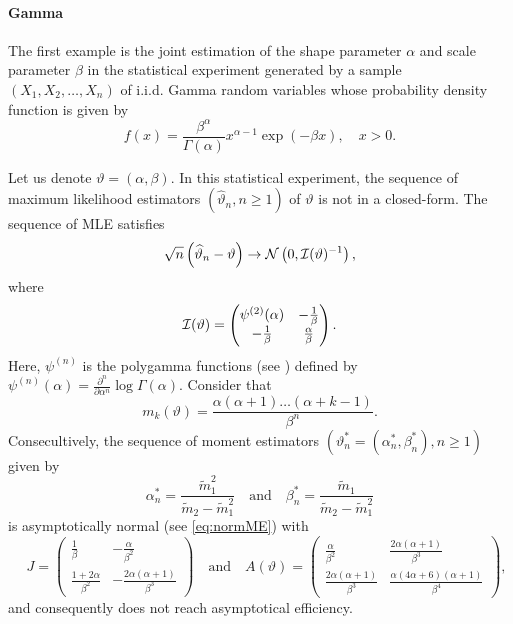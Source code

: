 \paragraph{Gamma}

The first example is the joint estimation of the shape parameter $\alpha$  and scale parameter $\beta$ in the statistical experiment generated by a sample $(X_1,X_2,\ldots,X_n)$ of i.i.d. Gamma random variables whose probability density function is given by
$$ f(x)= \frac{\beta^\alpha}{\Gamma(\alpha)}x^{\alpha-1} \exp( - \beta x ), \quad x >0.$$

Let us denote $\vartheta=(\alpha,\beta)$. In this statistical experiment, the sequence of maximum likelihood estimators $(\widehat{\vartheta}_n, n \geq 1)$ of $\vartheta$ is not in a closed-form.  The sequence of MLE satisfies 
$$ \sqrt{n}\left( \widehat{\vartheta}_n-\vartheta \right) \rightarrow {\cal N}\left(0,{\cal I}(\vartheta)^{-1}\right),$$
where 
$$ {\cal I}(\vartheta)=\begin{pmatrix} \psi^{(2)}(\alpha) & -\frac{1}{\beta} \\ - \frac{1}{\beta} &  \frac{\alpha}{\beta}\end{pmatrix}.$$
Here, $\psi^{(n)}$ is the polygamma functions (see  \cite[section 6.4.1, page 260]{AS72}) defined by $\psi^{(n)}(\alpha)=\frac{\partial^n}{\partial \alpha^n} \log \Gamma(\alpha)$. Consider that 
$$ m_k(\vartheta) = \frac{\alpha(\alpha+1) \ldots (\alpha+k-1)}{\beta^n}.$$
Consecultively, the sequence of moment estimators  $(\vartheta^*_n=(\alpha^*_n,\beta^*_n), n \geq1)$  given by
$$\alpha^*_n=\frac{\tilde{m}_1^2}{\tilde{m}_2-\tilde{m}_1^2} \quad \mbox{and} \quad \beta^*_n=\frac{\tilde{m}_1}{\tilde{m}_2-\tilde{m}_1^2}$$
is asymptotically normal (see \eqref{eq:normME})
with  
$$ \quad J=\begin{pmatrix}  \frac{1}{\beta} &  -\frac{\alpha}{\beta^2}  \\ \frac{1+2\alpha}{\beta^2}  & -\frac{2 \alpha(\alpha +1)}{\beta^3}  \end{pmatrix} \quad  \mbox{and}  \quad A(\vartheta)=\begin{pmatrix} \frac{\alpha}{\beta^2} & \frac{2 \alpha(\alpha +1)}{\beta^3} \\ \frac{2 \alpha(\alpha +1)}{\beta^3} & \frac{\alpha (4\alpha+6) (\alpha+1)}{\beta^4}\end{pmatrix},$$
and consequently does not reach asymptotical efficiency.

